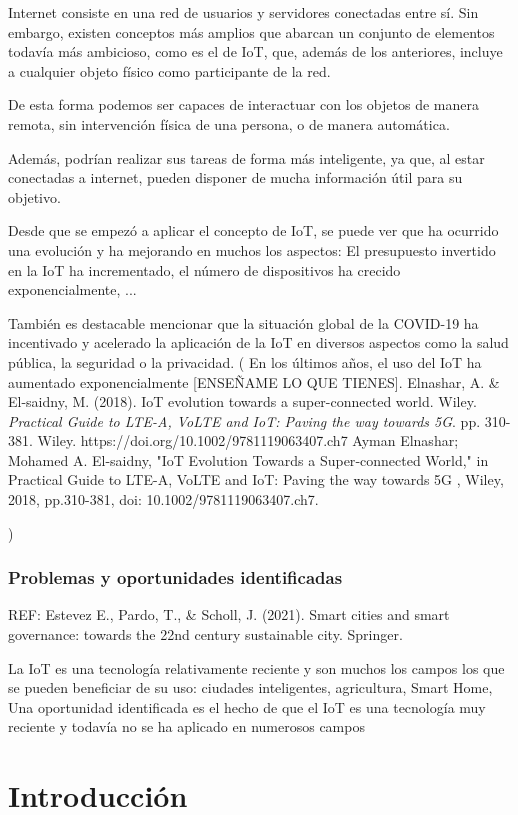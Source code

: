 \documentclass[12pt, a4paper, twoside]{article}
\begin{document}
Internet consiste en una red de usuarios y servidores conectadas entre sí.
Sin embargo, existen conceptos más amplios que abarcan un conjunto de elementos todavía más ambicioso,
como es el de IoT, que, además de los anteriores, incluye a cualquier objeto físico como participante de la red.

De esta forma podemos ser capaces de interactuar con los objetos de manera remota, sin intervención física de
una persona, o de manera automática.

Además, podrían realizar sus tareas de forma más inteligente, ya que, al estar conectadas a internet, pueden
disponer de mucha información útil para su objetivo.

Desde que se empezó a aplicar el concepto de IoT, se puede ver que ha ocurrido una evolución y ha mejorando en
muchos los aspectos: El presupuesto invertido en la IoT ha incrementado, el número de dispositivos ha crecido
exponencialmente, ...

También es destacable mencionar que la situación global de la COVID-19 ha incentivado y acelerado la aplicación
de la IoT en diversos aspectos como la salud pública, la seguridad o la privacidad.
(
En los últimos años, el uso del IoT ha aumentado exponencialmente [ENSEÑAME LO QUE TIENES].
Elnashar, A. \& El-saidny, M. (2018). IoT evolution towards a super-connected world. Wiley. \textit{Practical Guide to LTE-A, VoLTE and IoT: Paving the way towards 5G}. pp. 310-381. Wiley. https://doi.org/10.1002/9781119063407.ch7
Ayman Elnashar; Mohamed A. El-saidny, "IoT Evolution Towards a Super‐connected World," in Practical Guide to LTE-A, VoLTE and IoT: Paving the way towards 5G , Wiley, 2018, pp.310-381, doi: 10.1002/9781119063407.ch7.

)
\subsubsection{Problemas y oportunidades identificadas}
REF: 
Estevez E., Pardo, T., \& Scholl, J. (2021). Smart cities and smart governance: towards the 22nd century sustainable city. Springer.

La IoT es una tecnología relativamente reciente y son muchos los campos los que se pueden beneficiar de su uso:
ciudades inteligentes, agricultura, Smart Home, 
Una oportunidad identificada es el hecho de que el IoT es una tecnología muy reciente y todavía
no se ha aplicado en numerosos campos 
\section{Introducción}
\end{document}
